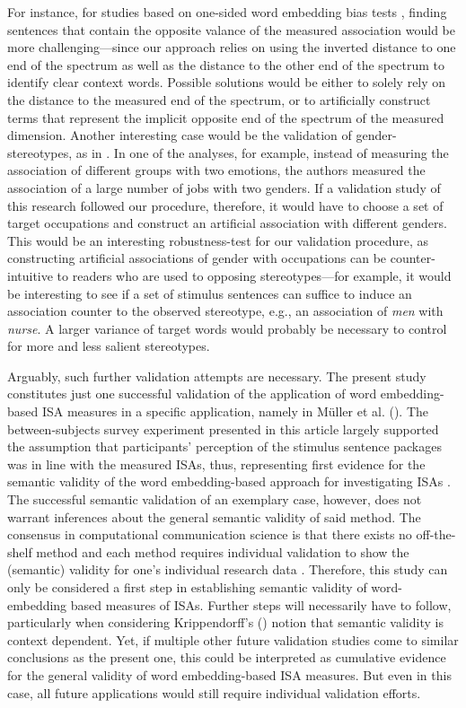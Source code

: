 For instance, for studies based on one-sided word embedding bias tests \parencite{kroon2021}, finding sentences that contain the opposite valance of the measured association would be more challenging---since our approach relies on using the inverted distance to one end of the spectrum as well as the distance to the other end of the spectrum to identify clear context words. Possible solutions would be either to solely rely on the distance to the measured end of the spectrum, or to artificially construct terms that represent the implicit opposite end of the spectrum of the measured dimension. Another interesting case would be the validation of gender-stereotypes, as in \textcite{garg:2018:W}. In one of the analyses, for example, instead of measuring the association of different groups with two emotions, the authors measured the association of a large number of jobs with two genders. If a validation study of this research followed our procedure, therefore, it would have to choose a set of target occupations and construct an artificial association with different genders. This would be an interesting robustness-test for our validation procedure, as constructing artificial associations of gender with occupations can be counter-intuitive to readers who are used to opposing stereotypes---for example, it would be interesting to see if a set of stimulus sentences can suffice to induce an association counter to the observed stereotype, e.g., an association of \textit{men} with \textit{nurse}. A larger variance of target words would probably be necessary to control for more and less salient stereotypes.

Arguably, such further validation attempts are necessary. The present study constitutes just one successful validation of the application of word embedding-based ISA measures in a specific application, namely in Müller et al. (\citeyear{mueller:2023:DRN}). The between-subjects survey experiment presented in this article largely supported the assumption that participants' perception of the stimulus sentence packages was in line with the measured ISAs, thus, representing first evidence for the semantic validity of the word embedding-based approach for investigating ISAs \parencite{durrheim2023}. The successful semantic validation of an exemplary case, however, does not warrant inferences about the general semantic validity of said method. The consensus in computational communication science is that there exists no off-the-shelf method and each method requires individual validation to show the (semantic) validity for one's individual research data \parencite{atteveldt:2018:wcm,baden:2021:TGC}. Therefore, this study can only be considered a first step in establishing semantic validity of word-embedding based measures of ISAs. Further steps will necessarily have to follow, particularly when considering Krippendorff's (\citeyear[][p. 323]{krippendorff2018content}) notion that semantic validity is context dependent. Yet, if multiple other future validation studies come to similar conclusions as the present one, this could be interpreted as cumulative evidence for the general validity of word embedding-based ISA measures. But even in this case, all future applications would still require individual validation efforts.

